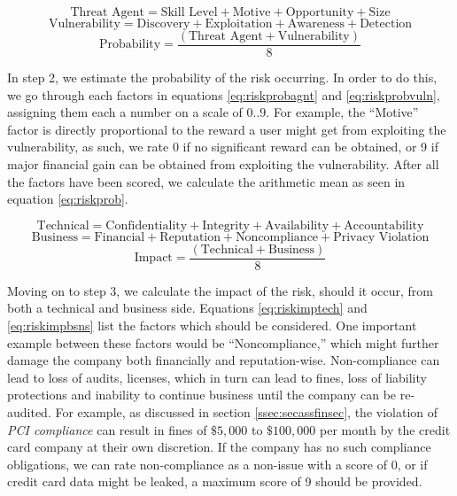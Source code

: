 \documentclass[a4paper,12pt]{article}
\begin{document}
	\begin{equation} \label{eq:riskprobagnt}
		\textrm{Threat Agent} = \textrm{Skill Level} + \textrm{Motive} + \textrm{Opportunity} + \textrm{Size}
	\end{equation}
	\begin{equation} \label{eq:riskprobvuln}
		\textrm{Vulnerability} = \textrm{Discovery} + \textrm{Exploitation} + \textrm{Awareness} + \textrm{Detection}
	\end{equation}
	\begin{equation} \label{eq:riskprob}
		\textrm{Probability} = \frac{(\textrm{Threat Agent} + \textrm{Vulnerability})}{8}
	\end{equation}
	
	In step 2, we estimate the probability of the risk occurring. In order to do this, we go through each factors in equations \ref{eq:riskprobagnt} and \ref{eq:riskprobvuln}, assigning them each a number on a scale of $0..9$. For example, the ``Motive'' factor is directly proportional to the reward a user might get from exploiting the vulnerability, as such, we rate 0 if no significant reward can be obtained, or 9 if major financial gain can be obtained from exploiting the vulnerability. After all the factors have been scored, we calculate the arithmetic mean as seen in equation \ref{eq:riskprob}.
	
	\begin{equation} \label{eq:riskimptech}
		\textrm{Technical} = \textrm{Confidentiality} + \textrm{Integrity} + \textrm{Availability} + \textrm{Accountability}
	\end{equation}
	\begin{equation} \label{eq:riskimpbsns}
		\textrm{Business} = \textrm{Financial} + \textrm{Reputation} + \textrm{Noncompliance} + \textrm{Privacy Violation}
	\end{equation}
	\begin{equation} \label{eq:riskimp}
		\textrm{Impact} = \frac{(\textrm{Technical} + \textrm{Business})}{8}
	\end{equation}
		
	Moving on to step 3, we calculate the impact of the risk, should it occur, from both a technical and business side. Equations \ref{eq:riskimptech} and \ref{eq:riskimpbsns} list the factors which should be considered. One important example between these factors would be ``Noncompliance,'' which might further damage the company both financially and reputation-wise. Non-compliance can lead to loss of audits, licenses, which in turn can lead to fines, loss of liability protections and inability to continue business until the company can be re-audited. For example, as discussed in section \ref{ssec:secassfinsec}, the violation of \textit{PCI compliance} can result in fines of $\$5,000$ to $\$100,000$ per month\cite{pcicompl} by the credit card company at their own discretion. If the company has no such compliance obligations, we can rate non-compliance as a non-issue with a score of 0, or if credit card data might be leaked, a maximum score of 9 should be provided.
	
\end{document}
